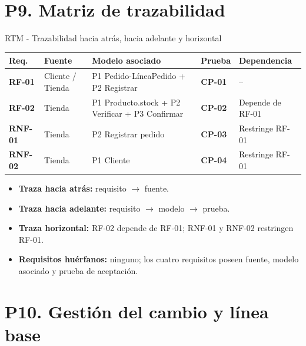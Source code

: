 \documentclass[11pt,a4paper]{article}
\begin{document}
\section*{P9. Matriz de trazabilidad}
\begin{taskbox}{RTM - Trazabilidad hacia atrás, hacia adelante y horizontal}
\scriptsize
\begin{tabularx}{\textwidth}{>{\bfseries}p{1.5cm} p{2.1cm} X >{\bfseries}p{1.5cm} X}
\toprule
\textcolor{uteqblue}{Req.} & \textcolor{uteqblue}{Fuente} & \textcolor{uteqblue}{Modelo asociado} & \textcolor{uteqblue}{Prueba} & \textcolor{uteqblue}{Dependencia} \\
\midrule
RF-01 & Cliente / Tienda & P1 Pedido-LíneaPedido + P2 Registrar & CP-01 & -- \\
RF-02 & Tienda & P1 Producto.stock + P2 Verificar + P3 Confirmar & CP-02 & Depende de RF-01 \\
RNF-01 & Tienda & P2 Registrar pedido & CP-03 & Restringe RF-01 \\
RNF-02 & Tienda & P1 Cliente & CP-04 & Restringe RF-01 \\
\bottomrule
\end{tabularx}
\normalsize

\begin{itemize}
  \item \textbf{Traza hacia atrás:} requisito $\rightarrow$ fuente.
  \item \textbf{Traza hacia adelante:} requisito $\rightarrow$ modelo $\rightarrow$ prueba.
  \item \textbf{Traza horizontal:} RF-02 depende de RF-01; RNF-01 y RNF-02 restringen RF-01.
  \item \textbf{Requisitos huérfanos:} ninguno; los cuatro requisitos poseen fuente, modelo asociado y prueba de aceptación.
\end{itemize}
\end{taskbox}


\section*{P10. Gestión del cambio y línea base}
\end{document}

